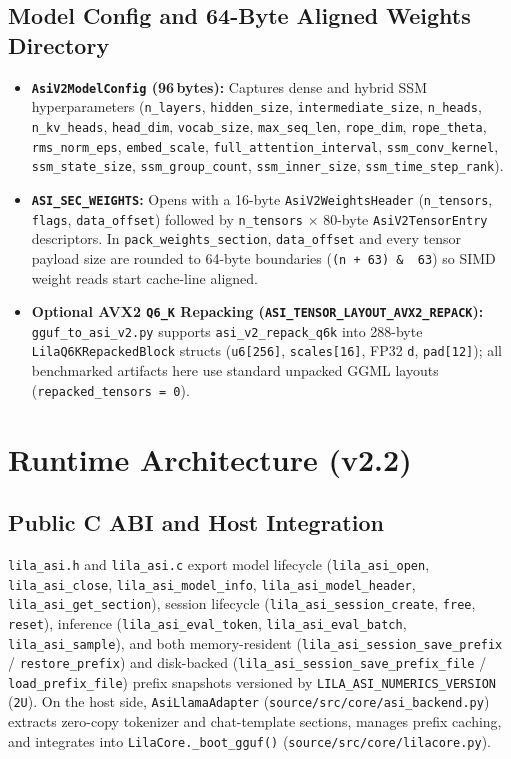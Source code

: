 \documentclass[11pt,a4paper]{article}
\begin{document}
\subsection{Model Config and 64-Byte Aligned Weights Directory}
\begin{itemize}
    \item \textbf{\texttt{AsiV2ModelConfig} (96\,bytes):} Captures dense and hybrid SSM hyperparameters (\texttt{n\_layers}, \texttt{hidden\_size}, \texttt{intermediate\_size}, \texttt{n\_heads}, \texttt{n\_kv\_heads}, \texttt{head\_dim}, \texttt{vocab\_size}, \texttt{max\_seq\_len}, \texttt{rope\_dim}, \texttt{rope\_theta}, \texttt{rms\_norm\_eps}, \texttt{embed\_scale}, \texttt{full\_attention\_interval}, \texttt{ssm\_conv\_kernel}, \texttt{ssm\_state\_size}, \texttt{ssm\_group\_count}, \texttt{ssm\_inner\_size}, \texttt{ssm\_time\_step\_rank}).
    \item \textbf{\texttt{ASI\_SEC\_WEIGHTS}:} Opens with a 16-byte \texttt{AsiV2WeightsHeader} (\texttt{n\_tensors}, \texttt{flags}, \texttt{data\_offset}) followed by \texttt{n\_tensors} $\times$ 80-byte \texttt{AsiV2TensorEntry} descriptors. In \texttt{pack\_weights\_section}, \texttt{data\_offset} and every tensor payload size are rounded to 64-byte boundaries (\texttt{(n + 63) \& ~63}) so SIMD weight reads start cache-line aligned.
    \item \textbf{Optional AVX2 \texttt{Q6\_K} Repacking (\texttt{ASI\_TENSOR\_LAYOUT\_AVX2\_REPACK}):} \texttt{gguf\_to\_asi\_v2.py} supports \texttt{asi\_v2\_repack\_q6k} into 288-byte \texttt{LilaQ6KRepackedBlock} structs (\texttt{u6[256]}, \texttt{scales[16]}, FP32 \texttt{d}, \texttt{pad[12]}); all benchmarked artifacts here use standard unpacked GGML layouts (\texttt{repacked\_tensors = 0}).
\end{itemize}

\section{Runtime Architecture (v2.2)}

\subsection{Public C ABI and Host Integration}
\texttt{lila\_asi.h} and \texttt{lila\_asi.c} export model lifecycle (\texttt{lila\_asi\_open}, \texttt{lila\_asi\_close}, \texttt{lila\_asi\_model\_info}, \texttt{lila\_asi\_model\_header}, \texttt{lila\_asi\_get\_section}), session lifecycle (\texttt{lila\_asi\_session\_create}, \texttt{free}, \texttt{reset}), inference (\texttt{lila\_asi\_eval\_token}, \texttt{lila\_asi\_eval\_batch}, \texttt{lila\_asi\_sample}), and both memory-resident (\texttt{lila\_asi\_session\_save\_prefix} / \texttt{restore\_prefix}) and disk-backed (\texttt{lila\_asi\_session\_save\_prefix\_file} / \texttt{load\_prefix\_file}) prefix snapshots versioned by \texttt{LILA\_ASI\_NUMERICS\_VERSION} (\texttt{2U}). On the host side, \texttt{AsiLlamaAdapter} (\texttt{source/src/core/asi\_backend.py}) extracts zero-copy tokenizer and chat-template sections, manages prefix caching, and integrates into \texttt{LilaCore.\_boot\_gguf()} (\texttt{source/src/core/lilacore.py}).
\end{document}
